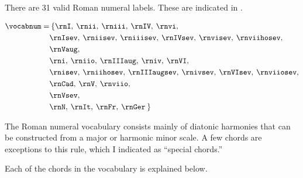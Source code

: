 
There are 31 valid Roman numeral labels. These are indicated
in .


\begin{equation}
    \begin{split}
    \vocabnum = & \: \{ \rnI, \: \rnii, \: \rniii, \: \rnIV, \: \rnvi,\\
                & \rnIsev, \: \rniisev, \: \rniiisev, \: \rnIVsev, \: \rnvisev, \: \rnviihosev,\\
                & \rnVaug,\\
                & \rni, \: \rniio, \: \rnIIIaug, \: \rniv, \: \rnVI,\\ 
                & \rnisev, \: \rniihosev, \: \rnIIIaugsev, \: \rnivsev, \: \rnVIsev, \: \rnviiosev,\\
                & \rnCad, \: \rnV, \: \rnviio,\\
                & \rnVsev,\\
                & \rnN, \: \rnIt, \: \rnFr, \: \rnGer \: \}
    \end{split}
\end{equation}

The Roman numeral vocabulary consists mainly of diatonic
harmonies that can be constructed from a major or harmonic
minor scale. A few chords are exceptions to this rule, \: which
I indicated as ``special chords.''

Each of the chords in the vocabulary is explained below.


